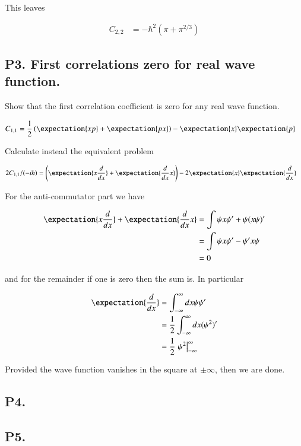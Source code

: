 This leaves 

\begin{align*}
C_{2,2} &=
-\hbar^2 \left( \pi + \pi^{2/3} \right)
\end{align*}

\subsection{P3. First correlations zero for real wave function. }

Show that the first correlation coefficient is zero for any real wave function.

\begin{align*}
C_{1,1} &= \inv{2}\left( \expectation{x p} + \expectation{p x} \right) - \expectation{x}\expectation{p}
\end{align*}

Calculate instead the equivalent problem

\begin{align*}
2 C_{1,1}/(-i\hbar) &= \left( \expectation{x \frac{d}{dx}} + \expectation{\frac{d}{dx} x} \right) - 2 \expectation{x}\expectation{\frac{d}{dx}}
\end{align*}

For the anti-commutator part we have

\begin{align*}
\expectation{x \frac{d}{dx}} + \expectation{\frac{d}{dx} x} 
&=
\int \psi x \psi' + \psi (x \psi)' \\
&=
\int \psi x \psi' - \psi' x \psi \\
&= 0
\end{align*}

and for the remainder if one is zero then the sum is.  In particular

\begin{align*}
\expectation{\frac{d}{dx}} 
&= \int_{-\infty}^\infty dx \psi \psi' \\
&= \inv{2} \int_{-\infty}^\infty dx (\psi^2)' \\
&= \inv{2} \left. \psi^2 \right\vert_{-\infty}^\infty
\end{align*}

Provided the wave function vanishes in the square at $\pm \infty$, then we are done.

\subsection{P4. }
\subsection{P5. }
